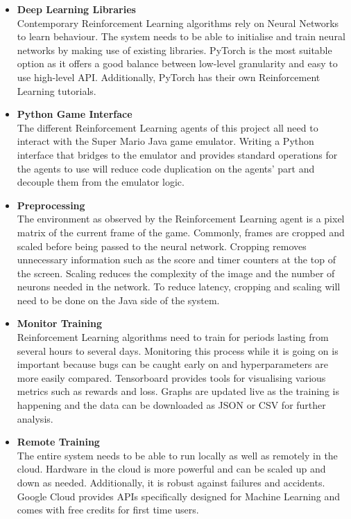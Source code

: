 \documentclass[notitlepage,a4paper,11pt]{article}
\begin{document}
\begin{itemize}
	\item \textbf{Deep Learning Libraries}\\
	Contemporary Reinforcement Learning algorithms rely on Neural Networks to learn behaviour. The system needs to be able to initialise and train neural networks by making use of existing libraries. PyTorch is the most suitable option as it offers a good balance between low-level granularity and easy to use high-level API. Additionally, PyTorch has their own Reinforcement Learning tutorials.
	
	\item \textbf{Python Game Interface}\\
	The different Reinforcement Learning agents of this project all need to interact with the Super Mario Java game emulator. Writing a Python interface that bridges to the emulator and provides standard operations for the agents to use will reduce code duplication on the agents' part and decouple them from the emulator logic.
	
	\item \textbf{Preprocessing}\\
	The environment as observed by the Reinforcement Learning agent is a pixel matrix of the current frame of the game. Commonly, frames are cropped and scaled before being passed to the neural network. Cropping removes unnecessary information such as the score and timer counters at the top of the screen. Scaling reduces the complexity of the image and the number of neurons needed in the network. To reduce latency, cropping and scaling will need to be done on the Java side of the system.
	
	\item \textbf{Monitor Training}\\
	Reinforcement Learning algorithms need to train for periods lasting from several hours to several days. Monitoring this process while it is going on is important because bugs can be caught early on and hyperparameters are more easily compared. Tensorboard provides tools for visualising various metrics such as rewards and loss. Graphs are updated live as the training is happening and the data can be downloaded as JSON or CSV for further analysis.
	
	\item \textbf{Remote Training}\\
	The entire system needs to be able to run locally as well as remotely in the cloud. Hardware in the cloud is more powerful and can be scaled up and down as needed. Additionally, it is robust against failures and accidents. Google Cloud provides APIs specifically designed for Machine Learning and comes with free credits for first time users.
	
\end{itemize}
\end{document}
